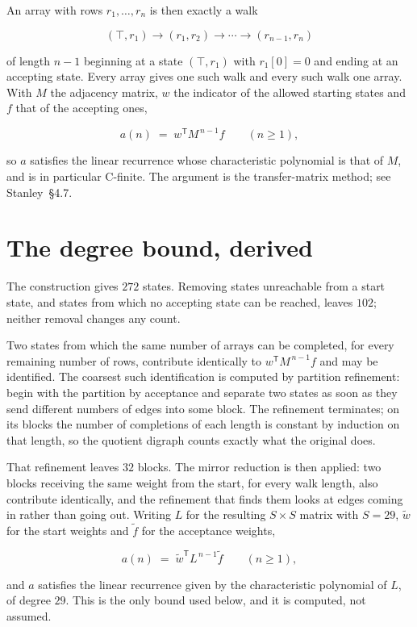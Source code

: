 \documentclass[11pt]{article}
\theoremstyle{definition}
\begin{document}
An array with rows $r_1,\dots,r_n$ is then exactly a walk

\[(\top,r_1) \to (r_1,r_2) \to \cdots \to (r_{n-1},r_n)\]

of length $n-1$ beginning at a state $(\top,r_1)$ with $r_1[0]=0$ and ending at an accepting state. Every array gives one such walk and every such walk one array. With $M$ the adjacency matrix, $w$ the indicator of the allowed starting states and $f$ that of the accepting ones,

\[a(n) \;=\; w^{\mathsf T} M^{\,n-1} f \qquad (n \ge 1),\]

so $a$ satisfies the linear recurrence whose characteristic polynomial is that of $M$, and is in particular C-finite. The argument is the transfer-matrix method; see Stanley~\S4.7.

\section{The degree bound, derived}

The construction gives $272$ states. Removing states unreachable from a start state, and states from which no accepting state can be reached, leaves $102$; neither removal changes any count.

Two states from which the same number of arrays can be completed, for every remaining number of rows, contribute identically to $w^{\mathsf T}M^{\,n-1}f$ and may be identified. The coarsest such identification is computed by partition refinement: begin with the partition by acceptance and separate two states as soon as they send different numbers of edges into some block. The refinement terminates; on its blocks the number of completions of each length is constant by induction on that length, so the quotient digraph counts exactly what the original does.

That refinement leaves $32$ blocks. The mirror reduction is then applied: two blocks receiving the same weight from the start, for every walk length, also contribute identically, and the refinement that finds them looks at edges coming in rather than going out. Writing $L$ for the resulting $S \times S$ matrix with $S = 29$, $\tilde w$ for the start weights and $\tilde f$ for the acceptance weights,

\[a(n) \;=\; \tilde w^{\mathsf T} L^{\,n-1} \tilde f \qquad (n \ge 1),\]

and $a$ satisfies the linear recurrence given by the characteristic polynomial of $L$, of degree $29$. This is the only bound used below, and it is computed, not assumed.
\end{document}
